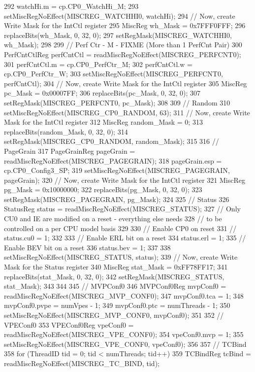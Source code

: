 \begin{DoxyCode}
{292     watchHi.m = cp.CP0_WatchHi_M;
293     setMiscRegNoEffect(MISCREG_WATCHHI0, watchHi);
294     // Now, create Write Mask for the IntCtl register
295     MiscReg wh_Mask = 0x7FFF0FFF;
296     replaceBits(wh_Mask, 0, 32, 0);
297     setRegMask(MISCREG_WATCHHI0, wh_Mask);
298 
299     // Perf Ctr - M - FIXME (More than 1 PerfCnt Pair)
300     PerfCntCtlReg perfCntCtl = readMiscRegNoEffect(MISCREG_PERFCNT0);
301     perfCntCtl.m = cp.CP0_PerfCtr_M;
302     perfCntCtl.w = cp.CP0_PerfCtr_W;
303     setMiscRegNoEffect(MISCREG_PERFCNT0, perfCntCtl);
304     // Now, create Write Mask for the IntCtl register
305     MiscReg pc_Mask = 0x00007FF;
306     replaceBits(pc_Mask, 0, 32, 0);
307     setRegMask(MISCREG_PERFCNT0, pc_Mask);
308 
309     // Random
310     setMiscRegNoEffect(MISCREG_CP0_RANDOM, 63);
311     // Now, create Write Mask for the IntCtl register
312     MiscReg random_Mask = 0;
313     replaceBits(random_Mask, 0, 32, 0);
314     setRegMask(MISCREG_CP0_RANDOM, random_Mask);
315 
316     // PageGrain
317     PageGrainReg pageGrain = readMiscRegNoEffect(MISCREG_PAGEGRAIN);
318     pageGrain.esp = cp.CP0_Config3_SP;
319     setMiscRegNoEffect(MISCREG_PAGEGRAIN, pageGrain);
320     // Now, create Write Mask for the IntCtl register
321     MiscReg pg_Mask = 0x10000000;
322     replaceBits(pg_Mask, 0, 32, 0);
323     setRegMask(MISCREG_PAGEGRAIN, pg_Mask);
324 
325     // Status
326     StatusReg status = readMiscRegNoEffect(MISCREG_STATUS);
327     // Only CU0 and IE are modified on a reset - everything else needs
328     // to be controlled on a per CPU model basis
329 
330     // Enable CP0 on reset
331     // status.cu0 = 1;
332 
333     // Enable ERL bit on a reset
334     status.erl = 1;
335     // Enable BEV bit on a reset
336     status.bev = 1;
337 
338     setMiscRegNoEffect(MISCREG_STATUS, status);
339     // Now, create Write Mask for the Status register
340     MiscReg stat_Mask = 0xFF78FF17;
341     replaceBits(stat_Mask, 0, 32, 0);
342     setRegMask(MISCREG_STATUS, stat_Mask);
343 
344 
345     // MVPConf0
346     MVPConf0Reg mvpConf0 = readMiscRegNoEffect(MISCREG_MVP_CONF0);
347     mvpConf0.tca = 1;
348     mvpConf0.pvpe = numVpes - 1;
349     mvpConf0.ptc = numThreads - 1;
350     setMiscRegNoEffect(MISCREG_MVP_CONF0, mvpConf0);
351 
352     // VPEConf0
353     VPEConf0Reg vpeConf0 = readMiscRegNoEffect(MISCREG_VPE_CONF0);
354     vpeConf0.mvp = 1;
355     setMiscRegNoEffect(MISCREG_VPE_CONF0, vpeConf0);
356 
357     // TCBind
358     for (ThreadID tid = 0; tid < numThreads; tid++) {
359         TCBindReg tcBind = readMiscRegNoEffect(MISCREG_TC_BIND, tid);
}}
\end{DoxyCode}
